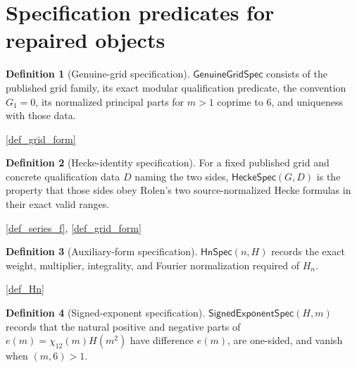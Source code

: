 \documentclass[11pt,a4paper]{article}
\numberwithin{equation}{section}
\theoremstyle{plain}\newtheorem{theorem}{Theorem}[section]\newaliascnt{proposition}{theorem}\newtheorem{proposition}[proposition]{Proposition}\aliascntresetthe{proposition}\newaliascnt{lemma}{theorem}\newtheorem{lemma}[lemma]{Lemma}\aliascntresetthe{lemma}
\theoremstyle{definition}\newaliascnt{definition}{theorem}\newtheorem{definition}[definition]{Definition}\aliascntresetthe{definition}\newaliascnt{notation}{theorem}\newtheorem{notation}[notation]{Notation}\aliascntresetthe{notation}
\providecommand{\lean}[1]{}\providecommand{\leanok}{}
\begin{document}
\section{Specification predicates for repaired objects}
\begin{definition}[Genuine-grid specification]\label{def_grid_spec}\lean{SptCM.Analytic.Repaired.AhlgrenKimGridTheorem}\leanok
$\mathsf{GenuineGridSpec}$ consists of the published grid family, its exact
modular qualification predicate, the convention $G_1=0$, its normalized
principal parts for $m>1$ coprime to $6$, and uniqueness with those data.
\end{definition}
\begin{uses-statement}\ref{def_grid_form}\end{uses-statement}
\begin{definition}[Hecke-identity specification]\label{def_hecke_spec}\lean{SptCM.Analytic.Repaired.HeckeIdentitySpec}\leanok
For a fixed published grid and concrete qualification data $D$ naming the
two sides, $\mathsf{HeckeSpec}(G,D)$ is the property that those sides obey
Rolen's two source-normalized Hecke formulas in their exact valid ranges.
\end{definition}
\begin{uses-statement}\ref{def_series_f}, \ref{def_grid_form}\end{uses-statement}
\begin{definition}[Auxiliary-form specification]\label{def_hn_spec}\lean{SptCM.Analytic.Repaired.AuxiliaryFormSpec}\leanok
$\mathsf{HnSpec}(n,H)$ records the exact weight, multiplier, integrality, and Fourier normalization required of $H_n$.
\end{definition}
\begin{uses-statement}\ref{def_Hn}\end{uses-statement}
\begin{definition}[Signed-exponent specification]\label{def_signed_exponent_spec}\lean{SptCM.Repair.SignedExponentSpec}\leanok
$\mathsf{SignedExponentSpec}(H,m)$ records that the natural positive and
negative parts of $e(m)=\chi_{12}(m)H(m^2)$ have difference $e(m)$, are
one-sided, and vanish when $(m,6)>1$.
\end{definition}
\end{document}
